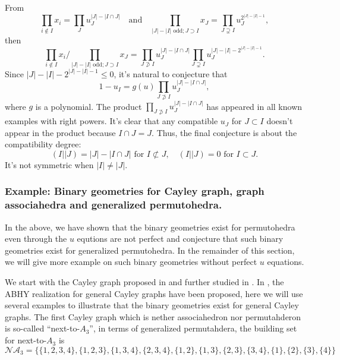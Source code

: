\documentclass[hidelinks,12pt]{article}
\begin{document}
From
\[
\prod_{i\not\in I}x_i=\prod_J u_J^{|J|-|I\cap J|}
\quad\text{and}\quad
\prod_{|J|-|I| \text{ odd}; J\supset I}x_J
=
\prod_{J\supsetneq I}u_J^{2^{|J|-|I|-1}},
\]
then
\[
\prod_{i\not\in I}x_i\bigg/\prod_{|J|-|I| \text{ odd}; J\supset I}x_J
=\prod_{J\not\supset I} u_J^{|J|-|I\cap J|}\prod_{J\supsetneq I} u_J^{|J|-|I|-2^{|J|-|I|-1}}.
\]
Since $|J|-|I|-2^{|J|-|I|-1}\leq 0$, it's natural to conjecture that
\begin{equation}
1-u_I=g(u)\prod_{J\not\supset I} u_J^{|J|-|I\cap J|},
\end{equation}
where $g$ is a polynomial.
The product $\prod_{J\not\supset I} u_J^{|J|-|I\cap J|}$ has appeared in all known examples with right powers. It's clear that any compatible $u_J$ for $J\subset I$ doesn't appear in the product because $I\cap J=J$. Thus, the final conjecture is about the compatibility degree:
\[
(I||J)=|J|-|I\cap J|\text{ for $I\not\subset J$},\quad  (I||J)=0 \text{ for $I\subset J$}.
\]
It's not symmetric when $|I|\neq |J|$.

\subsubsection{Example: Binary geometries for Cayley graph, graph associahedra and generalized permutohedra. }


In the above, we have shown that the binary geometries exist for permutohedra even through the $u$ equtions are not perfect and conjecture that such binary geometries exist for generalized permutohedra. In the remainder of this section, we will give more example on such binary geometries without perfect $u$ equations.


We start with the Cayley graph proposed in \cite{} and further studied in \cite{}. In \cite{}, the ABHY realization for general Cayley graphs have been proposed, here we will use several examples to illustrate that the binary geometries exist for general Cayley graphs. The first Cayley graph which is nether associahedron nor permutahderon is so-called  ``next-to-$A_{3}$'', in terms of generalized permutahdera, the building set for next-to-$A_{3}$ is 
\begin{equation}
   \mathscr{NA}_{3}=\{\{1,2,3,4\},\{1,2,3\},\{1,3,4\},\{2,3,4\},\{1,2\},\{1,3\},\{2,3\},\{3,4\},\{1\},\{2\},\{3\},\{4\}\}
\end{equation}
\end{document}
